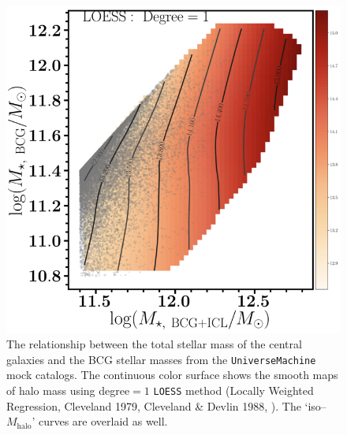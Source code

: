 \documentclass[a4paper,fleqn,usenatbib]{mnras}
\def\mhalo{{$M_{\mathrm{halo}}$}}
\def\um{\texttt{UniverseMachine}}
\begin{document}
    \begin{figure}
        \centering 
        \includegraphics[width=\columnwidth]{fig/um2_tot_bch_halo}
            \caption{
                The relationship between the total stellar mass of the central galaxies 
                and the BCG stellar masses from the \um{} mock catalogs.  
                The continuous color surface shows the smooth maps of halo mass using 
                degree$=1$ \texttt{LOESS} method (Locally Weighted Regression, 
                Cleveland 1979, Cleveland \& Devlin 1988, \citealt{Cappellari2013b}).  
                The `iso--\mhalo{}' curves are overlaid as well.
                }
        \label{fig:um2_m100_m10_3}
    \end{figure}
\end{document}
